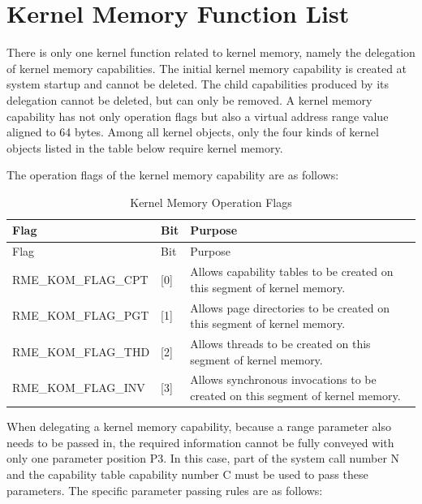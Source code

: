 \section{Kernel Memory Function List}\label{sec:3-kernel-memory-function-list}
\nopagebreak[4]

There is only one kernel function related to kernel memory, namely the delegation of kernel memory capabilities. The initial kernel memory capability is created at system startup and cannot be deleted. The child capabilities produced by its delegation cannot be deleted, but can only be removed. A kernel memory capability has not only operation flags but also a virtual address range value aligned to 64 bytes. Among all kernel objects, only the four kinds of kernel objects listed in the table below require kernel memory.

The operation flags of the kernel memory capability are as follows:

\begin{xltabular}{\textwidth}{@{}>{\hsize\raggedright\arraybackslash}X>{\hsize\raggedright\arraybackslash}X>{\hsize\raggedright\arraybackslash}X@{}}
\caption{Kernel Memory Operation Flags}\label{tab:3-22-kernel-memory-operation-flags}\\
\toprule
Flag & Bit & Purpose\tabularnewline
\endfirsthead
\toprule
Flag & Bit & Purpose\tabularnewline
\midrule
\endhead
\bottomrule
\endlastfoot
RME\_KOM\_FLAG\_CPT & {[}0{]} &
Allows capability tables to be created on this segment of kernel memory.\tabularnewline
RME\_KOM\_FLAG\_PGT & {[}1{]} &
Allows page directories to be created on this segment of kernel memory.\tabularnewline
RME\_KOM\_FLAG\_THD & {[}2{]} &
Allows threads to be created on this segment of kernel memory.\tabularnewline
RME\_KOM\_FLAG\_INV & {[}3{]} &
Allows synchronous invocations to be created on this segment of kernel memory.\tabularnewline
\end{xltabular}
\nopagebreak[4]

When delegating a kernel memory capability, because a range parameter also needs to be passed in, the required information cannot be fully conveyed with only one parameter position P3. In this case, part of the system call number N and the capability table capability number C must be used to pass these parameters. The specific parameter passing rules are as follows:

